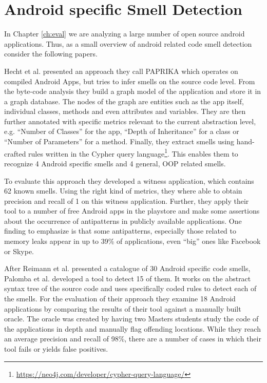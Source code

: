 \section{Android specific Smell Detection}

In Chapter \ref{ch:eval} we are analyzing a large number of open source android applications.
Thus, as a small overview of android related code smell detection consider the following papers.

Hecht et al. presented an approach they call PAPRIKA which operates on compiled Android Apps, but tries to infer smells on the source code level.
From the byte-code analysis they build a graph model of the application and store it in a graph database.
The nodes of the graph are entities such as the app itself, individual classes, methods and even attributes and variables.
They are then further annotated with specific metrics relevant to the current abstraction level, e.g. ``Number of Classes'' for the app, ``Depth of Inheritance'' for a class or ``Number of Parameters'' for a method.
Finally, they extract smells using hand-crafted rules written in the Cypher query language\footnote{\url{https://neo4j.com/developer/cypher-query-language/}}.
This enables them to recognize 4 Android specific smells and 4 general, OOP related smells.

To evaluate this approach they developed a witness application, which contains 62 known smells.
Using the right kind of metrics, they where able to obtain precision and recall of 1 on this witness application.
Further, they apply their tool to a number of free Android apps in the playstore and make some assertions about the occurrence of antipatterns in publicly available applications.
One finding to emphasize is that some antipatterns, especially those related to memory leaks appear in up to 39\% of applications, even ``big'' ones like Facebook or Skype.

After Reimann et al. \cite{reimann2014tool} presented a catalogue of 30 Android specific code smells, Palomba et al. \cite{palomba2017lightweight} developed a tool to detect 15 of them.
It works on the abstract syntax tree of the source code and uses specifically coded rules to detect each of the smells.
For the evaluation of their approach they examine 18 Android applications by comparing the results of their tool against a manually built oracle.
The oracle was created by having two Masters students study the code of the applications in depth and manually flag offending locations.
While they reach an average precision and recall of 98\%, there are a number of cases in which their tool fails or yields false positives.

